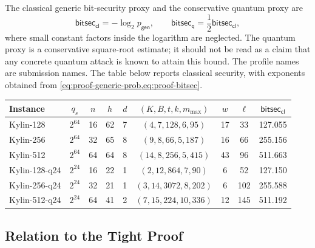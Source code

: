 The classical generic bit-security proxy and the conservative quantum proxy are
\begin{equation}
\label{eq:proof-bitsec}
    \mathsf{bitsec}_{\mathsf{cl}}=-\log_2 p_{\mathsf{gen}},
    \qquad
    \mathsf{bitsec}_{\mathsf{q}}=\frac{1}{2}\mathsf{bitsec}_{\mathsf{cl}},
\end{equation}
where small constant factors inside the logarithm are neglected.  The quantum
proxy is a conservative square-root estimate; it should not be read as a claim
that any concrete quantum attack is known to attain this bound.  The profile
names are submission names.  The table below reports classical security, with
exponents obtained from \cref{eq:proof-generic-prob,eq:proof-bitsec}.

\begin{center}
\begin{tabular}{lcccccccc}
\toprule
Instance & $q_s$ & $n$ & $h$ & $d$ & $(K,B,t,k,m_{\max})$ & $w$ & $\ell$ &
$\mathsf{bitsec}_{\mathsf{cl}}$ \\
\midrule
Kylin-128     & $2^{64}$ & 16 & 62 & 7  & $(4,7,128,6,95)$     & 17  & 33  & 127.055 \\
Kylin-256     & $2^{64}$ & 32 & 65 & 8  & $(9,8,66,5,187)$     & 16  & 66  & 255.156 \\
Kylin-512     & $2^{64}$ & 64 & 64 & 8  & $(14,8,256,5,415)$   & 43  & 96  & 511.663 \\
Kylin-128-q24 & $2^{24}$ & 16 & 22 & 1  & $(2,12,864,7,90)$    & 6   & 52  & 127.150 \\
Kylin-256-q24 & $2^{24}$ & 32 & 21 & 1  & $(3,14,3072,8,202)$  & 6   & 102 & 255.588 \\
Kylin-512-q24 & $2^{24}$ & 64 & 41 & 2  & $(7,15,224,10,336)$  & 12  & 145 & 511.192 \\
\bottomrule
\end{tabular}
\end{center}

\subsection{Relation to the Tight \SPHINCSP Proof}
\label{sec:proof-sphincs-comparison}

